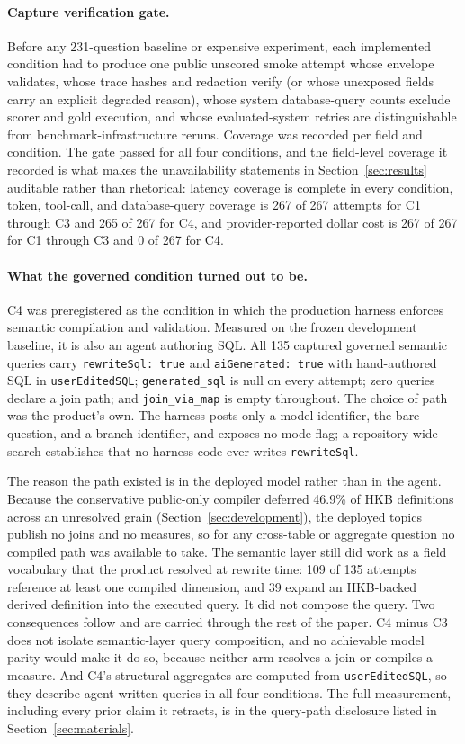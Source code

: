 \paragraph{Capture verification gate.}
Before any 231-question baseline or expensive experiment, each implemented
condition had to produce one public unscored smoke attempt whose envelope
validates, whose trace hashes and redaction verify (or whose unexposed fields
carry an explicit degraded reason), whose system database-query counts exclude
scorer and gold execution, and whose evaluated-system retries are distinguishable
from benchmark-infrastructure reruns. Coverage was recorded per field and
condition. The gate passed for all four conditions, and the field-level coverage
it recorded is what makes the unavailability statements in
Section~\ref{sec:results} auditable rather than rhetorical: latency coverage is
complete in every condition, token, tool-call, and database-query coverage is
267 of 267 attempts for C1 through C3 and 265 of 267 for C4, and
provider-reported dollar cost is 267 of 267 for C1 through C3 and 0 of 267 for
C4.

\paragraph{What the governed condition turned out to be.}
C4 was preregistered as the condition in which the production harness enforces
semantic compilation and validation. Measured on the frozen development
baseline, it is also an agent authoring SQL. All 135 captured governed semantic
queries carry \texttt{rewriteSql: true} and \texttt{aiGenerated: true} with
hand-authored SQL in \texttt{userEditedSQL}; \texttt{generated\_sql} is null on
every attempt; zero queries declare a join path; and \texttt{join\_via\_map} is
empty throughout. The choice of path was the product's own. The harness posts
only a model identifier, the bare question, and a branch identifier, and exposes
no mode flag; a repository-wide search establishes that no harness code ever
writes \texttt{rewriteSql}.

The reason the path existed is in the deployed model rather than in the agent.
Because the conservative public-only compiler deferred 46.9\% of HKB definitions
across an unresolved grain (Section~\ref{sec:development}), the deployed topics
publish no joins and no measures, so for any cross-table or aggregate question no
compiled path was available to take. The semantic layer still did work as a field
vocabulary that the product resolved at rewrite time: 109 of 135 attempts
reference at least one compiled dimension, and 39 expand an HKB-backed derived
definition into the executed query. It did not compose the query. Two
consequences follow and are carried through the rest of the paper. C4 minus C3
does not isolate semantic-layer query composition, and no achievable model parity
would make it do so, because neither arm resolves a join or compiles a measure.
And C4's structural aggregates are computed from \texttt{userEditedSQL}, so they
describe agent-written queries in all four conditions. The full measurement,
including every prior claim it retracts, is in the query-path disclosure listed
in Section~\ref{sec:materials}.
